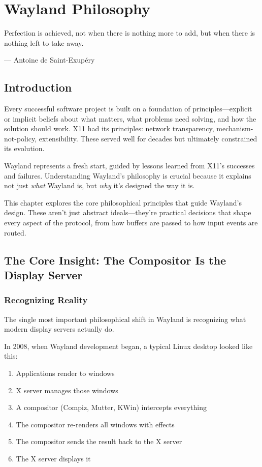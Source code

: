\chapter{Wayland Philosophy}
\label{ch:wayland-philosophy}

\epigraph{Perfection is achieved, not when there is nothing more to add, but when there is nothing left to take away.}{--- Antoine de Saint-Exupéry}

\section{Introduction}

Every successful software project is built on a foundation of principles—explicit or implicit beliefs about what matters, what problems need solving, and how the solution should work. X11 had its principles: network transparency, mechanism-not-policy, extensibility. These served well for decades but ultimately constrained its evolution.

Wayland represents a fresh start, guided by lessons learned from X11's successes and failures. Understanding Wayland's philosophy is crucial because it explains not just \textit{what} Wayland is, but \textit{why} it's designed the way it is.

This chapter explores the core philosophical principles that guide Wayland's design. These aren't just abstract ideals—they're practical decisions that shape every aspect of the protocol, from how buffers are passed to how input events are routed.

\section{The Core Insight: The Compositor Is the Display Server}

\subsection{Recognizing Reality}

The single most important philosophical shift in Wayland is recognizing what modern display servers actually do.

In 2008, when Wayland development began, a typical Linux desktop looked like this:

\begin{enumerate}
    \item Applications render to windows
    \item X server manages those windows
    \item A compositor (Compiz, Mutter, KWin) intercepts everything
    \item The compositor re-renders all windows with effects
    \item The compositor sends the result back to the X server
    \item The X server displays it
\end{enumerate}

